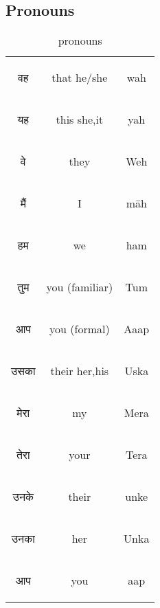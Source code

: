 \newpage 
\subsection{Pronouns}
\begin{table}[H]
    \centering
    \begin{tabular}{c|c|c}
    \begin{hindi} वह \end{hindi} & that he/she & wah \\
    \begin{hindi} यह \end{hindi} & this she,it& yah \\
    \begin{hindi} वे \end{hindi} & they &  Weh \\
    \begin{hindi} मैं \end{hindi} & I & mäh \\    
    \begin{hindi} हम \end{hindi} &  we & ham \\    
    \begin{hindi} तुम \end{hindi} &  you (familiar) & Tum\\    
    \begin{hindi} आप \end{hindi} &  you (formal) & Aaap \\    
    \begin{hindi} उसका  \end{hindi} & their her,his  & Uska \\    
    \begin{hindi} मेरा \end{hindi} &  my & Mera \\    
    \begin{hindi} तेरा \end{hindi} &  your & Tera \\    
    \begin{hindi} उनके \end{hindi} & their & unke \\
    \begin{hindi} उनका \end{hindi} & her & Unka \\
    \begin{hindi} आप \end{hindi} & you & aap \\
    \end{tabular}
    \caption{pronouns}    
    \label{tab:pronouns}
\end{table}

